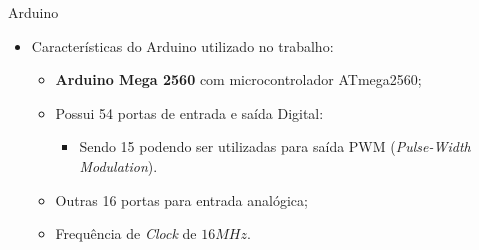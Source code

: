 	\begin{frame}{Arduino}
		\begin{itemize}
			\item Características do Arduino utilizado no trabalho:
			\bigskip
			\begin{itemize}
  				\setlength\itemsep{0.9em}
				\item \textbf{Arduino Mega 2560} com microcontrolador ATmega2560;
				\item Possui 54 portas de entrada e saída Digital:
				\begin{itemize}
					\item Sendo 15 podendo ser utilizadas para saída PWM (\textit{Pulse-Width Modulation}).
				\end{itemize}
				\item Outras 16 portas para entrada analógica;
				\item Frequência de \textit{Clock} de $16 MHz$.
			\end{itemize} 
		\end{itemize}
	\end{frame}


